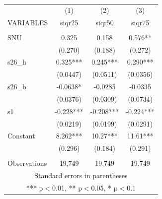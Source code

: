 \documentclass[]{article}
\begin{document}
\begin{tabular}{lccc} \hline
 & (1) & (2) & (3) \\
VARIABLES & siqr25 & siqr50 & siqr75 \\ \hline
 &  &  &  \\
SNU & 0.325 & 0.158 & 0.576** \\
 & (0.270) & (0.188) & (0.272) \\
s26\_h & 0.325*** & 0.245*** & 0.290*** \\
 & (0.0447) & (0.0511) & (0.0356) \\
s26\_b & -0.0638* & -0.0285 & -0.0335 \\
 & (0.0376) & (0.0309) & (0.0734) \\
s1 & -0.228*** & -0.208*** & -0.224*** \\
 & (0.0219) & (0.0199) & (0.0291) \\
Constant & 8.262*** & 10.27*** & 11.61*** \\
 & (0.296) & (0.184) & (0.291) \\
 &  &  &  \\
 Observations & 19,749 & 19,749 & 19,749 \\ \hline
\multicolumn{4}{c}{ Standard errors in parentheses} \\
\multicolumn{4}{c}{ *** p$<$0.01, ** p$<$0.05, * p$<$0.1} \\
\end{tabular}
\end{document}
